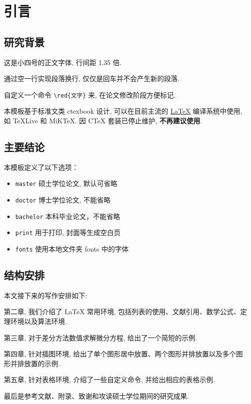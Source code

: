

\chapter{引言}\label{chap:Intro}

\section{研究背景}\label{sec:background}

这是小四号的正文字体, 行间距 1.35 倍.

通过空一行实现段落换行, 仅仅是回车并不会产生新的段落.

自定义一个命令 \verb|\red{文字}| 来, 在论文修改阶段方便标记.

本模板基于标准文类 ctexbook 设计, 可以在目前主流的 \href{https://en.wikibooks.org/wiki/LaTeX/Introduction}{\LaTeX{}} 编译系统中使用, 如 \TeX{}Live 和 MiK\TeX{}. 因 C\TeX{} 套装已停止维护, \textbf{不再建议使用}.


\section{主要结论}\label{sec:mainResults}

本模板定义了以下选项：
\begin{itemize}
  \item \verb|master| \quad 硕士学位论文, 默认可省略
  \item \verb|doctor| \quad 博士学位论文, 不能省略
  \item \verb|bachelor| \quad 本科毕业论文，不能省略
  \item \verb|print| \quad 用于打印, 封面等生成空白页
  \item \verb|fonts| \quad 使用本地文件夹 fonts 中的字体
\end{itemize}


\section{结构安排}

本文接下来的写作安排如下:

第二章, 我们介绍了 LaTeX 常用环境, 包括列表的使用、文献引用、数学公式、定理环境以及算法环境.

第三章, 对于差分方法数值求解微分方程, 给出了一个简短的示例.

第四章, 针对插图环境, 给出了单个图形居中放置、两个图形并排放置以及多个图形并排放置的示例.

第五章, 针对表格环境, 介绍了一些自定义命令, 并给出相应的表格示例.

最后是参考文献、附录、致谢和攻读硕士学位期间的研究成果.

